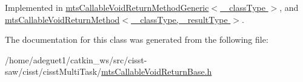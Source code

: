 Implemented in \hyperlink{classmts_callable_void_return_method_generic_aac08fdc349e9cea779f98809fa77ba44}{mts\-Callable\-Void\-Return\-Method\-Generic$<$ \-\_\-class\-Type $>$}, and \hyperlink{classmts_callable_void_return_method_a2ca736ce45432c5cd746227795253ea3}{mts\-Callable\-Void\-Return\-Method$<$ \-\_\-class\-Type, \-\_\-result\-Type $>$}.



The documentation for this class was generated from the following file\-:\begin{DoxyCompactItemize}
\item 
/home/adeguet1/catkin\-\_\-ws/src/cisst-\/saw/cisst/cisst\-Multi\-Task/\hyperlink{mts_callable_void_return_base_8h}{mts\-Callable\-Void\-Return\-Base.\-h}\end{DoxyCompactItemize}
